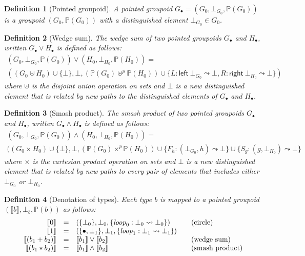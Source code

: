 \documentclass[11pt]{article}
\newcommand{\union}{\cup}
\newtheorem{definition}{Definition}
\renewcommand{\path}{\leadsto}
\newcommand{\paths}[1]{\mathds{P}(#1)}
\newcommand{\dt}[1]{\llbracket #1 \rrbracket}
\newcommand{\leftv}[1]{\textsf{left}~#1}
\newcommand{\rightv}[1]{\textsf{right}~#1}
\newcommand{\wedgesum}{\vee}
\newcommand{\smashproduct}{\wedge}
\begin{document}
\begin{definition}[Pointed groupoid]
A pointed groupoid $G_{\bullet} = (G_0, \bot_{G_0}, \paths{G_0})$ is
a groupoid $(G_0, \paths{G_0})$ with a distinguished element
$\bot_{G_0} \in G_0$.
\end{definition}

\begin{definition}[Wedge sum]
The \emph{wedge sum} of two pointed groupoids $G_\bullet$ and $H_\bullet$,
written $G_\bullet \wedgesum H_\bullet$ is defined as follows:
\[\begin{array}{l}
(G_0, \bot_{G_0}, \paths{G_0}) \wedgesum 
(H_0, \bot_{H_0}, \paths{H_0}) = \\
((G_0 \uplus H_0) \union \{ \bot \},
 \bot,
 (\paths{G_0} \uplus^p \paths{H_0}) \union
 \{ L: \leftv{\bot_{G_0}} \path \bot, 
    R: \rightv{\bot_{H_0}} \path \bot \})
\end{array}\]
where $\uplus$ is the disjoint union operation on sets and $\bot$ is a new
distinguished element that is related by new paths to the distinguished
elements of $G_\bullet$ and $H_\bullet$.
\end{definition}

\begin{definition}[Smash product]
The \emph{smash product} of two pointed groupoids $G_\bullet$ and
$H_\bullet$, written $G_\bullet \smashproduct H_\bullet$ is defined as
follows:
\[\begin{array}{l}
(G_0, \bot_{G_0}, \paths{G_0}) \smashproduct
(H_0, \bot_{H_0}, \paths{H_0}) = \\
((G_0 \times H_0) \union \{ \bot \},
 \bot,
 (\paths{G_0} \times^p \paths{H_0}) \union
 \{ F_h: (\bot_{G_0},h) \path \bot \} \union 
 \{ S_g: (g,\bot_{H_0}) \path \bot \} 
\end{array}\]
where $\times$ is the cartesian product operation on sets and $\bot$ is a new
distinguished element that is related by new paths to every pair of elements
that includes either $\bot_{G_0}$ or $\bot_{H_0}$. 
\end{definition}

\begin{definition}[Denotation of types]
Each type $b$ is mapped to a \emph{pointed groupoid} $(\dt{b}, \bot_b,
\paths{b})$ as follows:
\[\begin{array}{rcl@{\qquad}l}
\dt{0} &=& (\{ \bot_0 \}, \bot_0, \{ \mathit{loop}_0 : \bot_0 \path \bot_0 \}) &
           (\mbox{circle}) \\
\dt{1} &=& (\{ \bullet, \bot_1 \}, \bot_1, 
           \{ \mathit{loop}_1 : \bot_1 \path \bot_1 \}) &\\
\dt{(b_1 + b_2)} &=& \dt{b_1} \wedgesum \dt{b_2} & 
           (\mbox{wedge~sum}) \\
\dt{(b_1 * b_2)} &=& \dt{b_1} \smashproduct \dt{b_2} & 
           (\mbox{smash~product})
\end{array}\]
\end{definition} 
\end{document}
